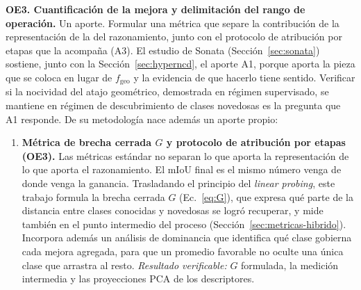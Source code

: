 \medskip
\noindent\textbf{OE3. Cuantificación de la mejora y delimitación del rango de
operación.} Un aporte. Formular una métrica que separe la contribución de la
representación de la del razonamiento, junto con el protocolo de atribución por
etapas que la acompaña (A3). El estudio de Sonata (Sección~\ref{sec:sonata}) sostiene, junto con la
Sección~\ref{sec:hyperncd}, el aporte A1, porque aporta la pieza que se coloca en
lugar de $f_{\text{geo}}$ y la evidencia de que hacerlo tiene sentido. Verificar
si la nocividad del atajo geométrico, demostrada en régimen supervisado, se
mantiene en régimen de descubrimiento de clases novedosas es la pregunta que A1
responde. De su metodología nace además un aporte propio:

\begin{enumerate}
\item[\textbf{A3}] \textbf{Métrica de brecha cerrada $G$ y protocolo de
atribución por etapas (OE3).} Las métricas estándar no separan lo que aporta la
representación de lo que aporta el razonamiento. El mIoU final es el mismo número
venga de donde venga la ganancia. Trasladando el principio del \emph{linear
probing}, este trabajo formula la brecha cerrada $G$ (Ec.~\eqref{eq:G}), que
expresa qué parte de la distancia entre clases conocidas y novedosas se logró
recuperar, y mide también en el punto intermedio del proceso
(Sección~\ref{sec:metricas-hibrido}). Incorpora además un análisis de dominancia
que identifica qué clase gobierna cada mejora agregada, para que un promedio
favorable no oculte una única clase que arrastra al resto. \emph{Resultado
verificable:} $G$ formulada, la medición intermedia y las proyecciones PCA de los
descriptores.
\end{enumerate}


